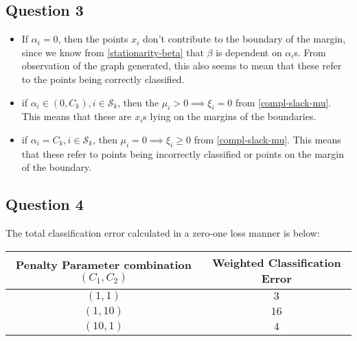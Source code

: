 \documentclass{article}
\newcommand{\setS}{\mathcal{S}}
\begin{document}
\subsection*{Question 3}
\begin{itemize}
\item If \(\alpha_{i} = 0\), then the points \(x_{i}\) don't contribute to the boundary of the margin, since we know from \ref{stationarity-beta} that \(\beta\) is dependent on \(\alpha_{i}\)s. From observation of the graph generated, this also seems to mean that these refer to the points being correctly classified.
\item if \(\alpha_{i} \in (0, C_{k}), i \in \setS_{k}\), then the \(\mu_{i} > 0 \implies \xi_{i} = 0\) from \ref{compl-slack-mu}. This means that these are \(x_{i}\)s lying on the margins of the boundaries.
\item if \(\alpha_{i} = C_{k}, i \in \setS_{k}\), then \(\mu_{i} = 0 \implies \xi_{i} \geq 0\) from \ref{compl-slack-mu}. This means that these refer to points being incorrectly classified or points on the margin of the boundary.
\end{itemize}

\subsection*{Question 4}
The total classification error calculated in a zero-one loss manner is below:
\begin{center}
\begin{tabular}{|c|c|}
\hline
Penalty Parameter combination \((C_{1}, C_{2})\) & Weighted Classification Error \\
\hline
\hline
\((1, 1)\) & \(3\) \\
\hline
\((1, 10)\) & \(16\) \\
\hline
\((10, 1)\) & \(4\) \\
\hline
\end{tabular}
\end{center}
\end{document}
